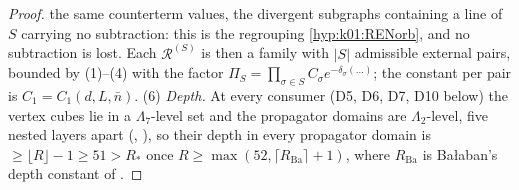 \begin{proof}
the same counterterm values, the divergent subgraphs containing a line of $S$ carrying no subtraction: this is the regrouping \cref{hyp:k01:RENorb}, and no subtraction is lost. Each $\mathcal R^{(S)}$ is then a family with $|S|$ admissible external pairs, bounded by (1)--(4) with the factor $\Pi_S=\prod_{\sigma\in S}C_\sigma e^{-\delta_\sigma(\dots)}$; the constant per pair is $C_1=C_1(d,L,\bar n)$. (6) \emph{Depth.} At every consumer (D5, D6, D7, D10 below) the vertex cubes lie in a $\Lambda_7$-level set and the propagator domains are $\Lambda_2$-level, five nested layers apart (\cite[p.~411]{Ba3}, \cite[(2.53), (2.56), Prop.~2.6]{Ba2}), so their depth in every propagator domain is $\ge\lfloor R\rfloor-1\ge51>R_*$ once $R\ge\max(52,\lceil R_{\mathrm{Ba}}\rceil+1)$, where $R_{\mathrm{Ba}}$ is Ba{\l}aban's depth constant of \cite[(2.19)]{Ba4}.
\end{proof}

